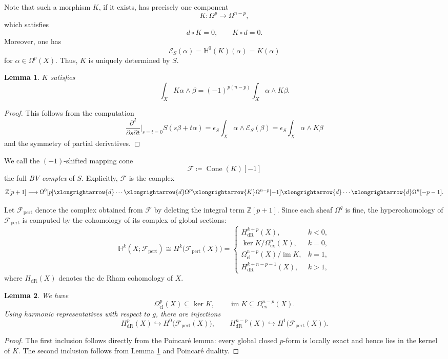 \documentclass[12pt]{amsart}
\numberwithin{table}{section}
\numberwithin{equation}{section}
\newtheorem{lem}{Lemma}[section]
\theoremstyle{plain}
\newcommand{\sE}{\mathcal{E}}
\newcommand{\sF}{\mathcal{F}}
\newcommand{\Z}{\mathbb{Z}}
\begin{document}
Note that such a morphism $K$, if it exists, has precisely one component
\[
K\colon \Omega^p \longrightarrow \Omega^{n-p},
\]
which satisfies
\[
d \circ K  =  0, \qquad K \circ d = 0.
\]
Moreover, one has
\[
\sE_S(\alpha) = \mathbb H^0(K)(\alpha) = K(\alpha)
\]
for $\alpha \in \Omega^p(X)$. Thus, $K$ is uniquely determined by $S$.

\begin{lem}\label{selfdual}
	$K$ satisfies
	\[
	\int_X  K \alpha \wedge \beta = (-1)^{p(n-p)} \int_X \alpha \wedge K \beta.
	\]
\end{lem}
\begin{proof}
	This follows from the computation
	\[
	\frac{\partial^2}{\partial s \partial t} \bigg|_{s=t=0} S(s \beta + t\alpha) = \epsilon_S \int_X \alpha \wedge \sE_S(\beta) = \epsilon_S \int_X \alpha \wedge K \beta
	\]
	and the symmetry of partial derivatives.
\end{proof}

We call the $(-1)$-shifted mapping cone
\[
\sF\coloneq\operatorname{Cone}(K)[-1]
\]
the full \emph{BV complex} of $S$. Explicitly, $\sF$ is the complex 
\[
\Z[p+1]
\longrightarrow
\Omega^0[p]
\xlongrightarrow{d}\cdots
\xlongrightarrow{d}
\Omega^p
\xlongrightarrow{K}
\Omega^{n-p}[-1]
\xlongrightarrow{d}\cdots
\xlongrightarrow{d}
\Omega^n[-p-1].
\]

Let $\sF_{\mathrm{pert}}$ denote the complex obtained from $\sF$ by deleting the integral term $\Z[p+1]$. Since each sheaf $\Omega^q$ is fine, the hypercohomology of $\sF_{\mathrm{pert}}$ is computed by the cohomology of
its complex of global sections:
\[
\mathbb H^k(X;\sF_{\mathrm{pert}})
\cong
H^k\!\bigl(\sF_{\mathrm{pert}}(X)\bigr)
=
\begin{cases}
	H^{k+p}_{\mathrm{dR}}(X), & k<0,\\[2mm]
	\ker K\big/\Omega^p_{\mathrm{ex}}(X), & k=0,\\[2mm]
	\Omega^{n-p}_{\mathrm{cl}}(X)\big/\operatorname{im}K, & k=1,\\[2mm]
	H^{k+n-p-1}_{\mathrm{dR}}(X), & k>1,
\end{cases}
\]
where $H_{\mathrm{dR}}(X)$ denotes the de Rham cohomology of $X$.
\begin{lem}
	We have
	\[
	\Omega^p_{\mathrm{cl}}(X)\subseteq \ker K,
	\qquad
	\operatorname{im}K\subseteq \Omega^{n-p}_{\mathrm{ex}}(X).
	\]
	Using harmonic representatives with respect to $g$, there are injections
	\[
	H^p_{\mathrm{dR}}(X)
	\hookrightarrow
	H^0\!\bigl(\sF_{\mathrm{pert}}(X)\bigr),
	\qquad
	H^{n-p}_{\mathrm{dR}}(X)
	\hookrightarrow
	H^1\!\bigl(\sF_{\mathrm{pert}}(X)\bigr).
	\]
\end{lem}
\begin{proof}
	The first inclusion follows directly from the Poincar\'e lemma: every global closed $p$-form is locally exact and hence lies in the kernel of $K$. The second inclusion follows from Lemma \ref{selfdual} and Poincar\'e duality. 
\end{proof}
\end{document}
